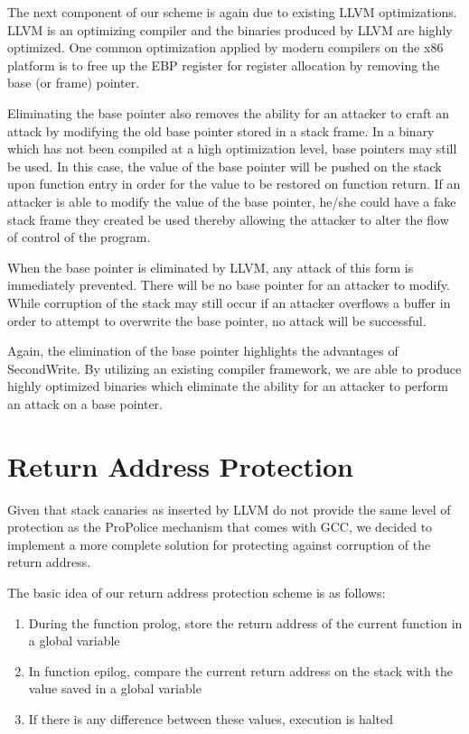 The next component of our scheme is again due to existing LLVM optimizations. LLVM is an optimizing
compiler and the binaries produced by LLVM are highly optimized. One common optimization applied by
modern compilers on the x86 platform is to free up the EBP register for register allocation by
removing the base (or frame) pointer.

Eliminating the base pointer also removes the ability for an attacker to craft an attack by
modifying the old base pointer stored in a stack frame. In a binary which has not been compiled at a
high optimization level, base pointers may still be used. In this case, the value of the base
pointer will be pushed on the stack upon function entry in order for the value to be restored on
function return. If an attacker is able to modify the value of the base pointer, he/she could have a
fake stack frame they created be used thereby allowing the attacker to alter the flow of control of
the program.

When the base pointer is eliminated by LLVM, any attack of this form is immediately prevented. There
will be no base pointer for an attacker to modify. While corruption of the stack may still occur if
an attacker overflows a buffer in order to attempt to overwrite the base pointer, no attack will be
successful.

Again, the elimination of the base pointer highlights the advantages of SecondWrite. By utilizing an
existing compiler framework, we are able to produce highly optimized binaries which eliminate the
ability for an attacker to perform an attack on a base pointer.

\section{Return Address Protection}

Given that stack canaries as inserted by LLVM do not provide the same level of protection as the
ProPolice mechanism that comes with GCC, we decided to implement a more complete solution for
protecting against corruption of the return address.

The basic idea of our return address protection scheme is as follows:

\begin{enumerate}

 \item During the function prolog, store the return address of the current function in a global
 variable

 \item In function epilog, compare the current return address on the stack with the value saved in a
 global variable

 \item If there is any difference between these values, execution is halted

\end{enumerate}


